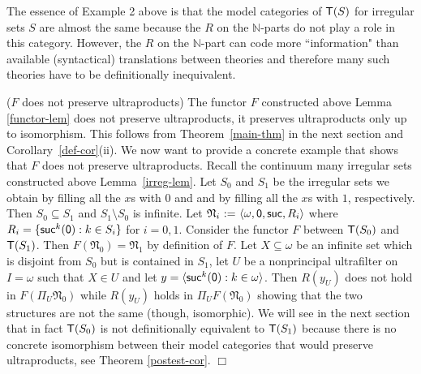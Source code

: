 \documentclass[12pt,leqno]{article}
\newcommand{\de}{\mbox{\ :=\ }}
\newcommand{\Nn}{\mbox{$\mathfrak N$}}
\newcommand{\T}{\mbox{\sf T}}
\newcommand{\N}{\mathbb N}
\newcommand{\zero}{\mbox{\sf 0}}
\newcommand{\suc}{\mbox{\sf suc}}
\begin{document}
\bigskip%
The essence of Example 2 above is that the model categories of
$\T(S)$ for irregular sets $S$ are almost
the same because the $R$ on the $\N$-parts do not play a role in
this category. However, the $R$ on the $\N$-part can code more
``information" than available (syntactical) translations between theories and therefore many such theories have to be definitionally
inequivalent.
\bigskip

($F$ does not preserve ultraproducts)  The functor $F$ constructed above Lemma \ref{functor-lem} does not preserve ultraproducts, it preserves ultraproducts only up to isomorphism. This follows from Theorem~\ref{main-thm} in the next section and Corollary~\ref{def-cor}(ii). We now want to provide a concrete example that shows that $F$ does not preserve ultraproducts. Recall the continuum many irregular sets constructed above Lemma~\ref{irreg-lem}. Let $S_0$ and $S_1$ be the irregular sets we obtain by filling all the $x$s with $0$ and and by filling all the $x$s with $1$, respectively. Then $S_0\subseteq S_1$ and $S_1\setminus S_0$ is infinite. Let $\Nn_i\de\langle\omega,\zero,\suc,R_i\rangle$ where $R_i=\{\suc^k(\zero) : k\in S_i\}$  for $i=0,1$.  Consider the functor $F$ between $\T(S_0)$ and $\T(S_1)$. Then $F(\Nn_0)=\Nn_1$ by definition of $F$. Let $X\subseteq\omega$ be an infinite set which is disjoint from $S_0$ but is contained in $S_1$, let $U$ be a nonprincipal ultrafilter on $I=\omega$ such that $X\in U$ and let $y=\langle\suc^k(\zero) : k\in\omega\rangle$. Then $R(y_U)$ does not hold in $F(\Pi_U\Nn_0)$ while $R(y_U)$ holds in $\Pi_U F(\Nn_0)$ showing that the two structures are not the same (though, isomorphic). We will see in the next section that in fact $\T(S_0)$ is not definitionally equivalent to $\T(S_1)$ because there is no concrete isomorphism between their model categories that would preserve ultraproducts, see Theorem \ref{postest-cor}.  $\Box$\bigskip
\end{document}

